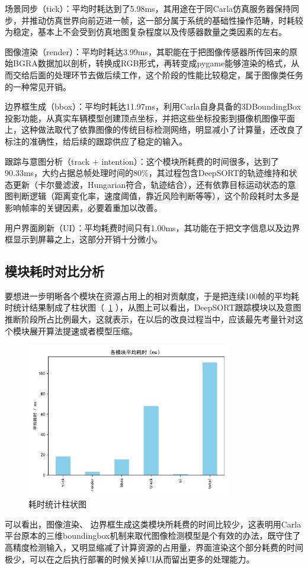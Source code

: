 场景同步（tick）：平均时耗达到了5.98ms，其用途在于同Carla仿真服务器保持同步，并推动仿真世界向前迈进一帧，这一部分属于系统的基础性操作范畴，时耗较为稳定，基本上不会受到仿真地图复杂程度以及传感器数量之类因素的左右。

图像渲染（render）：平均时耗达3.99ms，其职能在于把图像传感器所传回来的原始BGRA数据加以剖析，转换成RGB形式，再转变成pygame能够渲染的格式，从而交给后面的处理环节去做后续工作，这个阶段的性能比较稳定，属于图像类任务的一种常见开销。

边界框生成（bbox）：平均时耗达11.97ms，利用Carla自身具备的3DBoundingBox投影功能，从真实车辆模型创建顶点坐标，并把这些坐标投影到摄像机图像平面上，这种做法取代了依靠图像的传统目标检测网络，明显减小了计算量，还改良了标注的准确性，给后续的跟踪供应了稳定的输入。

跟踪与意图分析（track + intention）：这个模块所耗费的时间很多，达到了90.33ms，大约占据总帧处理时间的80\%，其过程包含DeepSORT的轨迹维持和状态更新（卡尔曼滤波，Hungarian符合，轨迹结合），还有依靠目标运动状态的意图判断逻辑（距离变化率，速度阈值，靠近风险判断等等），这个阶段耗时太多是影响帧率的关键因素，必要着重加以改善。

用户界面刷新（UI）：平均耗费时间只有1.00ms，其功能在于把文字信息以及边界框显示到屏幕之上，这部分开销十分微小。

\subsection{模块耗时对比分析}

要想进一步明晰各个模块在资源占用上的相对贡献度，于是把连续100帧的平均耗时统计结果制成了柱状图（~\ref{fig:time} ），从图上可以看出，DeepSORT跟踪模块以及意图推断阶段所占比例最大，这就表示，在以后的改良过程当中，应该最先考量针对这个模块展开算法提速或者模型压缩。

\begin{figure}[H]
	\centering
	\includegraphics[width=0.8\textwidth]{images/图12 耗时统计柱状图.pdf}  %
	\caption{耗时统计柱状图}
	\label{fig:time}  %
\end{figure}

可以看出，图像渲染、 边界框生成这类模块所耗费的时间比较少，这表明用Carla平台原本的三维boundingbox机制来取代图像检测模型是个有效的办法，既守住了高精度检测输入，又明显缩减了计算资源的占用量，界面渲染这个部分耗费的时间极少，可以在之后执行部署的时候关掉UI从而留出更多的处理能力。


\begin{tabular}{l l}
\end{tabular}
